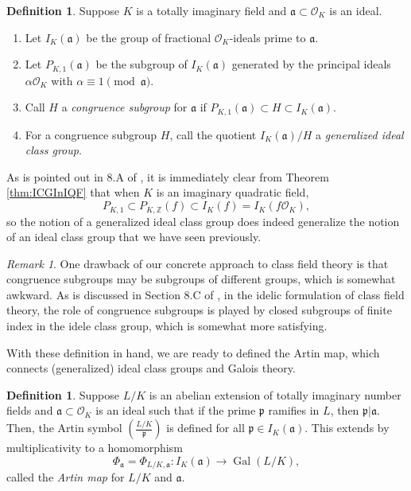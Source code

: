 \documentclass{amsart}
\theoremstyle{definition}
\newtheorem{definition}[thm]{Definition}
\theoremstyle{remark}
\newtheorem{remark}[thm]{Remark}
\numberwithin{equation}{section}
\newcommand{\cO}{\mathcal O}
\newcommand{\fka}{\mathfrak a}
\newcommand{\fkp}{\mathfrak p}
\newcommand{\bbZ}{\mathbb Z}
\newcommand{\artin}[2]{\left( \frac{#1}{#2}\right)}
\DeclareMathOperator{\Gal}{Gal}
\begin{document}
\begin{definition}
Suppose $K$ is a totally imaginary field and $\fka \subset \cO_{K}$ is an ideal.
\begin{enumerate}
\item Let $I_{K}(\fka)$ be the group of fractional $\cO_{K}$-ideals prime to $\fka$.
\item Let $P_{K,1}(\fka)$ be the subgroup of $I_{K}(\fka)$ generated by the principal ideals $\alpha \cO_{K}$ with $\alpha \equiv 1 \pmod{\fka}$.
\item Call $H$ a \emph{congruence subgroup} for $\fka$ if $P_{K,1}(\fka) \subset H \subset I_{K}(\fka)$.
\item For a congruence subgroup $H$, call the quotient $I_{K}(\fka)/H$ a \emph{generalized ideal class group}.
\end{enumerate}
\end{definition}

 As is pointed out in 8.A of \cite{CoxPrimes}, it is immediately clear from Theorem \ref{thm:ICGInIQF} that when $K$ is an imaginary quadratic field, 
 \[
 P_{K, 1} \subset P_{K, \bbZ}(f) \subset I_{K}(f) = I_{K}(f\cO_{K}),
 \]
 so the notion of a generalized ideal class group does indeed generalize the notion of an ideal class group that we have seen previously.
 
 \begin{remark}
 One drawback of our concrete approach to class field theory is that congruence subgroups may be subgroups of different groups, which is somewhat awkward. As is discussed in Section 8.C of \cite{CoxPrimes}, in the idelic formulation of class field theory, the role of congruence subgroups is played by closed subgroups of finite index in the idele class group, which is somewhat more satisfying. 
 \end{remark}
  
 With these definition in hand, we are ready to defined the Artin map, which connects (generalized) ideal class groups and Galois theory.

 \begin{definition} \label{def:ArtinMap}
 Suppose $L/K$ is an abelian extension of totally imaginary number fields and $\fka \subset \cO_{K}$ is an ideal such that if the prime $\fkp$ ramifies in $L$, then $\fkp|\fka$. Then, the Artin symbol $\artin{L/K}{\fkp}$ is defined for all $\fkp \in I_{K}(\fka)$. This extends by multiplicativity to a homomorphism
 \[
 \Phi_{\fka} = \Phi_{L/K, \fka}: I_{K}(\fka) \to \Gal(L/K),
 \]
 called the \emph{Artin map} for $L/K$ and $\fka$.
 \end{definition}
 
\end{document}

